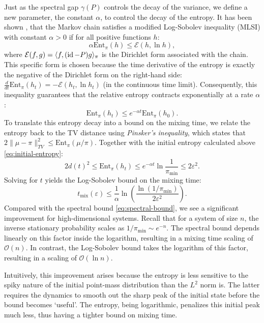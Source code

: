 Just as the spectral gap $\gamma(P)$ controls the decay of the variance, we define a new parameter, the constant $\alpha$, to control the decay of the entropy. It has been shown \cite{bobkov2006modified}, that the Markov chain satisfies a modified Log-Sobolev inequality (MLSI) with constant $\alpha > 0$ if for all positive functions $h$:
\begin{equation}
    \alpha \text{Ent}_\pi(h) \leq \mathcal{E}(h, \ln h),
\end{equation}
where $\mathcal{E}(f, g) = \langle f, (\operatorname{id}-P)g \rangle_\pi$ is the Dirichlet form associated with the chain. This specific form is chosen because the time derivative of the entropy is exactly the negative of the Dirichlet form on the right-hand side: $\frac{d}{dt}\text{Ent}_\pi(h_t) = -\mathcal{E}(h_t, \ln h_t)$ (in the continuous time limit). Consequently, this inequality guarantees that the relative entropy contracts exponentially at a rate $\alpha$:
\begin{equation}
    \text{Ent}_\pi(h_t) \leq e^{-\alpha t} \text{Ent}_\pi(h_0).
\end{equation}
To translate this entropy decay into a bound on the mixing time, we relate the entropy back to the TV distance using \textit{Pinsker's inequality}, which states that $2\|\mu - \pi\|_{TV}^2 \leq \text{Ent}_\pi(\mu/\pi)$.
Together with the initial entropy calculated above \eqref{eq:initial-entropy}:
$$
2 d(t)^2 \leq \text{Ent}_\pi(h_t) \leq e^{-\alpha t} \ln \frac{1}{\pi_{\min}} \leq 2\varepsilon^2.
$$
Solving for $t$ yields the Log-Sobolev bound on the mixing time:
\begin{equation}
    \label{eq:log-sobolev-bound}
    t_\text{mix}(\varepsilon) \leq \frac{1}{\alpha} \ln \left( \frac{\ln(1/\pi_{\min})}{2\varepsilon^2} \right).
\end{equation}
Compared with the spectral bound \eqref{eq:spectral-bound}, we see a significant improvement for high-dimensional systems. Recall that for a system of size $n$, the inverse stationary probability scales as $1/\pi_{\min} \sim e^{-n}$. The spectral bound depends linearly on this factor inside the logarithm, resulting in a mixing time scaling of $\mathcal{O}(n)$. In contrast, the Log-Sobolev bound takes the logarithm of this factor, resulting in a scaling of $\mathcal{O}(\ln n)$.

Intuitively, this improvement arises because the entropy is less sensitive to the spiky nature of the initial point-mass distribution than the $L^2$ norm is. The latter requires the dynamics to smooth out the sharp peak of the initial state before the bound becomes `useful'. The entropy, being logarithmic, penalizes this initial peak much less, thus having a tighter bound on mixing time. 

